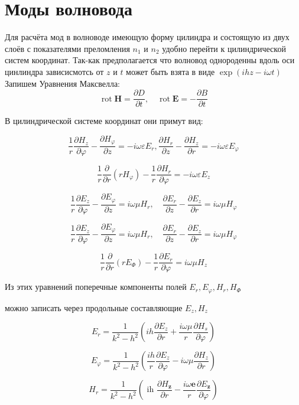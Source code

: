 \section{Моды волновода}

Для расчёта мод в волноводе имеющую форму цилиндра и состоящую из двух слоёв с показателями преломления $ n_1 $ и $ n_2 $ удобно перейти к цилиндрической систем координат. Так-как предполагается что волновод  однороденны вдоль оси цинлиндра зависисмотсь от $ z $ и $ t $ может быть взята в виде $\exp (i h z-i \omega t)$
Запишем Уравнения Максвелла:
$$\operatorname{rot} \mathbf{H}=\frac{\partial D}{\partial t}, \quad \operatorname{rot} \mathbf{E}=-\frac{\partial B}{\partial t}$$

В цилиндрической системе координат они примут вид:

$$\frac{1}{r} \frac{\partial H_{z}}{\partial \varphi}-\frac{\partial H_{\varphi}}{\partial z}=-i \omega \varepsilon E_{r}, \frac{\partial H_{r}}{\partial z}-\frac{\partial H_{z}}{\partial r}=-i \omega \varepsilon E_{\varphi}$$

$$\frac{1}{r} \frac{\partial}{\partial r}\left(r H_{\varphi}\right)-\frac{1}{r} \frac{\partial H_{r}}{\partial \varphi}=-i \omega \varepsilon E_{z}$$

$$\frac{1}{r} \frac{\partial E_{z}}{\partial \varphi}-\frac{\partial E_{\varphi}}{\partial z}=i \omega \mu H_{r}, \quad \frac{\partial E_{r}}{\partial z}-\frac{\partial E_{z}}{\partial r}=i \omega \mu H_{\varphi}$$

$$\frac{1}{r} \frac{\partial E_{z}}{\partial \varphi}-\frac{\partial E_{\varphi}}{\partial z}=i \omega \mu H_{r}, \quad \frac{\partial E_{r}}{\partial z}-\frac{\partial E_{z}}{\partial r}=i \omega \mu H_{\varphi}$$

$$\frac{1}{r} \frac{\partial}{\partial r}\left(r E_{\Phi}\right)-\frac{1}{r} \frac{\partial E_{r}}{\partial \varphi}=i \omega \mu H_{z}$$


Из этих уравнений поперечные компоненты полей $E_{r}, E_{\varphi}, H_{r}, H_{\Phi}$

можно записать через продольные составляющие $E_{z}, H_{z}$

$$E_{r}=\frac{1}{k^{2}-h^{2}}\left(ih \frac{\partial E_{z}}{\partial r}+\frac{i \omega \mu}{r} \frac{\partial H_{s}}{\partial \varphi}\right)$$

$$E_{\varphi}=\frac{1}{k^{2}-h^{2}}\left(\frac{i h}{r} \frac{\partial E_{z}}{\partial \varphi}-i \omega \mu \frac{\partial H_{z}}{\partial r}\right)$$

$$H_{r}=\frac{1}{k^{2}-h^{2}}\left(\text { ih } \frac{\partial H_{\mathbf{z}}}{\partial r}-\frac{i \omega \mathbf{e}}{r} \frac{\partial E_{\mathbf{z}}}{\partial \varphi}\right)$$


